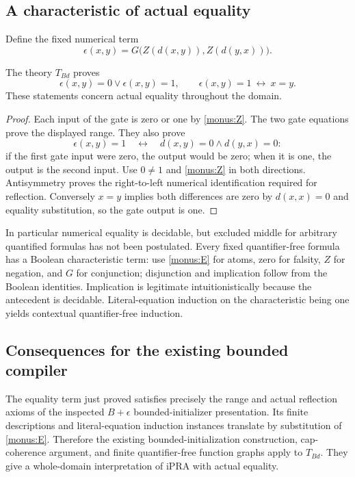 \subsection{A characteristic of actual equality}
Define the fixed numerical term
\[
 \epsilon(x,y)=G\bigl(Z(d(x,y)),Z(d(y,x))\bigr).
 \tag{E}\label{monus:E}
\]

\begin{theorem}\label{monus:reflection}
The theory $T_{Bd}$ proves
\[
 \epsilon(x,y)=0\lor\epsilon(x,y)=1,
 \qquad
 \epsilon(x,y)=1\ \longleftrightarrow\ x=y.
\]
These statements concern actual equality throughout the domain.
\end{theorem}
\begin{proof}
Each input of the gate is zero or one by \eqref{monus:Z}. The two
gate equations prove the displayed range. They also prove
\[
 \epsilon(x,y)=1\quad\longleftrightarrow\quad
                  d(x,y)=0\wedge d(y,x)=0:
\]
if the first gate input were zero, the output would be zero; when it
is one, the output is the second input. Use $0\ne1$ and
\eqref{monus:Z} in both directions. Antisymmetry proves the right-to-left
numerical identification required for reflection. Conversely $x=y$
implies both differences are zero by $d(x,x)=0$ and equality substitution,
so the gate output is one.
\end{proof}

In particular numerical equality is decidable, but excluded middle for
arbitrary quantified formulas has not been postulated. Every fixed
quantifier-free formula has a Boolean characteristic term: use
\eqref{monus:E} for atoms, zero for falsity, $Z$ for negation, and $G$
for conjunction; disjunction and implication follow from the Boolean
identities. Implication is legitimate intuitionistically because the
antecedent is decidable. Literal-equation induction on the characteristic
being one yields contextual quantifier-free induction.

\subsection{Consequences for the existing bounded compiler}

The equality term just proved satisfies precisely the range and actual
reflection axioms of the inspected $B+\epsilon$ bounded-initializer
presentation. Its finite descriptions and literal-equation induction
instances translate by substitution of \eqref{monus:E}. Therefore the
existing bounded-initialization construction, cap-coherence argument,
and finite quantifier-free function graphs apply to $T_{Bd}$.
They give a whole-domain interpretation of iPRA with actual equality.

